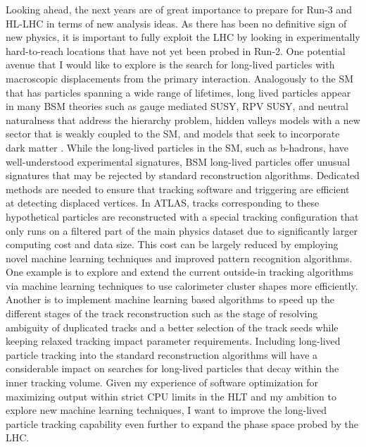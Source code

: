 \documentclass[a4paper]{article}
\begin{document}
Looking ahead, the next years are of great importance to prepare for Run-3 and HL-LHC in terms of new analysis ideas. As there has been no definitive sign of new physics, it is important to fully exploit the LHC by looking in experimentally hard-to-reach locations that have not yet been probed in Run-2. One potential avenue that I would like to explore is the search for long-lived particles with macroscopic displacements from the primary interaction. Analogously to the SM that has particles spanning a wide range of lifetimes, long lived particles appear in many BSM theories such as gauge mediated SUSY, RPV SUSY, and neutral naturalness that address the hierarchy problem, hidden valleys models with a new sector that is weakly coupled to the SM, and models that seek to incorporate dark matter \cite{alimena2019searching}. While the long-lived particles in the SM, such as b-hadrons, have well-understood experimental signatures, BSM long-lived particles offer unusual signatures that may be rejected by standard reconstruction algorithms. Dedicated methods are needed to ensure that tracking software and triggering are efficient at detecting displaced vertices. In ATLAS, tracks corresponding to these hypothetical particles are reconstructed with a special tracking configuration that only runs on a filtered part of the main physics dataset due to significantly larger computing cost and data size. This cost can be largely reduced by employing novel machine learning techniques and improved pattern recognition algorithms. One example is to explore and extend the current outside-in tracking algorithms via machine learning techniques to use calorimeter cluster shapes more efficiently. Another is to implement machine learning based algorithms to speed up the different stages of the track reconstruction such as the stage of resolving ambiguity of duplicated tracks and a  better selection of the track seeds while keeping relaxed tracking impact parameter requirements. Including long-lived particle tracking into the standard reconstruction algorithms will have a considerable impact on searches for long-lived particles that decay within the inner tracking volume. Given my experience of software optimization for maximizing output within strict CPU limits in the HLT and my ambition to explore new machine learning techniques, I want to improve the long-lived particle tracking capability even further to expand the phase space probed by the LHC.




\bigskip
\end{document}
